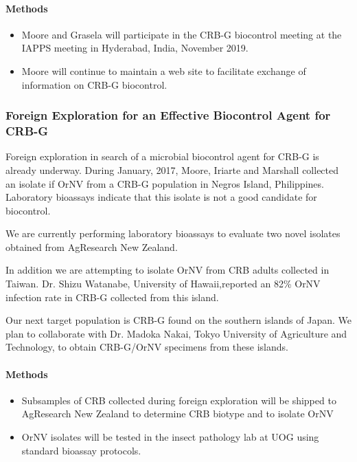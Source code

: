 \documentclass[14pt,english,letterpaper]{scrartcl}
\begin{document}
\paragraph{Methods}
\begin{itemize}
\item Moore and Grasela will participate in the CRB-G biocontrol meeting at the IAPPS meeting in Hyderabad, India, November 2019.
\item Moore will continue to maintain a web site to facilitate exchange of information on CRB-G biocontrol.
\end{itemize}

\subsubsection{Foreign Exploration for an Effective Biocontrol Agent for CRB-G}

Foreign exploration in search of a microbial biocontrol agent for CRB-G is already underway.
During January, 2017, Moore, Iriarte and Marshall collected an isolate if OrNV from a CRB-G population in Negros Island, Philippines. Laboratory bioassays indicate that this isolate is not a good candidate for biocontrol.

We are currently performing laboratory bioassays to evaluate two novel isolates obtained from AgResearch New Zealand.

In addition we are attempting to isolate OrNV from CRB adults collected in Taiwan. Dr. Shizu Watanabe, University of Hawaii,reported an 82\% OrNV infection rate in CRB-G collected from this island.

Our next target population is CRB-G found on the southern islands of Japan. We plan to collaborate with Dr. Madoka Nakai, Tokyo University of Agriculture and Technology, to obtain CRB-G/OrNV specimens from these islands.

\paragraph{Methods}

\begin{itemize}
	\item Subsamples of CRB collected during foreign exploration will be shipped to AgResearch New Zealand to determine CRB biotype and to isolate OrNV
	\item OrNV isolates will be tested in the insect pathology lab at UOG using standard bioassay protocols.
\end{itemize}
\end{document}

